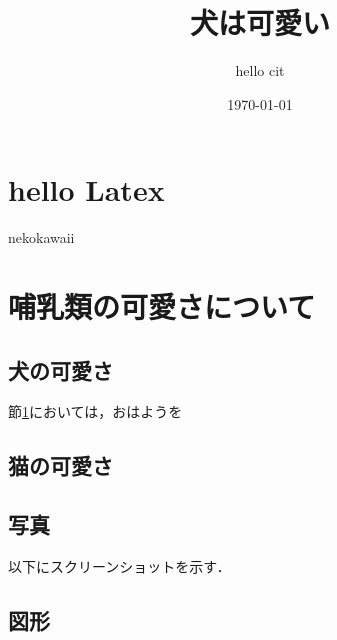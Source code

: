 \documentclass[dvipdfmx]{jsarticle}%
\title{犬は可愛い}
\author{hello cit}
\date{\today}
\begin{document}
\maketitle
\tableofcontents%

\section{hello Latex}
\label{hello}

nekokawaii

\section{哺乳類の可愛さについて}
\subsection{犬の可愛さ}
節\ref{hello}においては，おはようを

\subsection{猫の可愛さ}

\subsection{写真}
以下にスクリーンショットを示す．
\subsection{図形}
\end{document}
